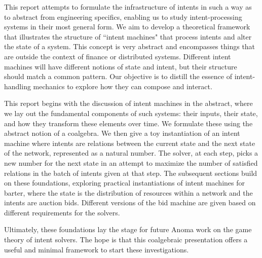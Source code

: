 This report attempts to formulate the infrastructure of intents in such a way as to abstract from engineering specifics, enabling us to study intent-processing systems in their most general form. We aim to develop a theoretical framework that illustrates the structure of ``intent machines" that process intents and alter the state of a system. This concept is very abstract and encompasses things that are outside the context of finance or distributed systems. Different intent machines will have different notions of state and intent, but their structure should match a common pattern. Our objective is to distill the essence of intent-handling mechanics to explore how they can compose and interact.

This report begins with the discussion of intent machines in the abstract, where we lay out the fundamental components of such systems: their inputs, their state, and how they transform these elements over time. We formulate these using the abstract notion of a coalgebra. We then give a toy instantiation of an intent machine where intents are relations between the current state and the next state of the network, represented as a natural number. The solver, at each step, picks a new number for the next state in an attempt to maximize the number of satisfied relations in the batch of intents given at that step. The subsequent sections build on these foundations, exploring practical instantiations of intent machines for barter, where the state is the distribution of resources within a network and the intents are auction bids. Different versions of the bid machine are given based on different requirements for the solvers.

Ultimately, these foundations lay the stage for future Anoma work on the game theory of intent solvers. The hope is that this coalgebraic presentation offers a useful and minimal framework to start these investigations. 